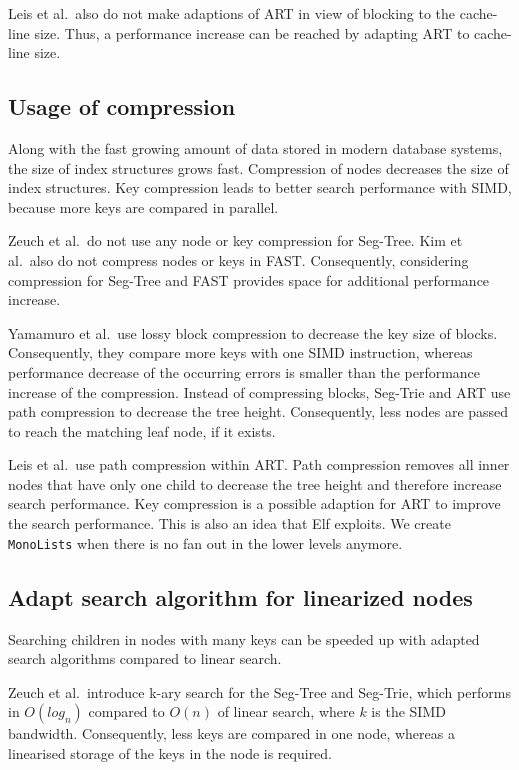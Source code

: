 \documentclass[runningheads,a4paper]{llncs}
\begin{document}
Leis et al.\ also do not make adaptions of ART in view of blocking to the cache-line size. Thus, a performance increase can be reached by adapting ART to cache-line size.


\subsection{Usage of compression}
Along with the fast growing amount of data stored in modern database systems, the size of index structures grows fast. Compression of nodes decreases the size of index structures. Key compression leads to better search performance with SIMD, because more keys are compared in parallel.

Zeuch et al.\ do not use any node or key compression for Seg-Tree. Kim et al.\ also do not compress nodes or keys in FAST. Consequently, considering compression for Seg-Tree and FAST provides space for additional performance increase.

Yamamuro et al.\ use lossy block compression to decrease the key size of blocks. Consequently, they compare more keys with one SIMD instruction, whereas performance decrease of the occurring errors is smaller than the performance increase of the compression. Instead of compressing blocks, Seg-Trie and ART use path compression to decrease the tree height. Consequently, less nodes are passed to reach the matching leaf node, if it exists.

Leis et al.\ use path compression within ART. Path compression removes all inner nodes that have only one child to decrease the tree height and therefore increase search performance. Key compression is a possible adaption for ART to improve the search performance. This is also an idea that Elf exploits. We create \verb.MonoLists. when there is no fan out in the lower levels anymore.

\subsection{Adapt search algorithm for linearized nodes}
Searching children in nodes with many keys can be speeded up with adapted search algorithms compared to linear search.

Zeuch et al.\ introduce k-ary search for the Seg-Tree and Seg-Trie, which performs in $O(log_n)$ compared to $O(n)$ of linear search, where $k$ is the SIMD bandwidth. Consequently, less keys are compared in one node, whereas a linearised storage of the keys in the node is required. 
\end{document}
